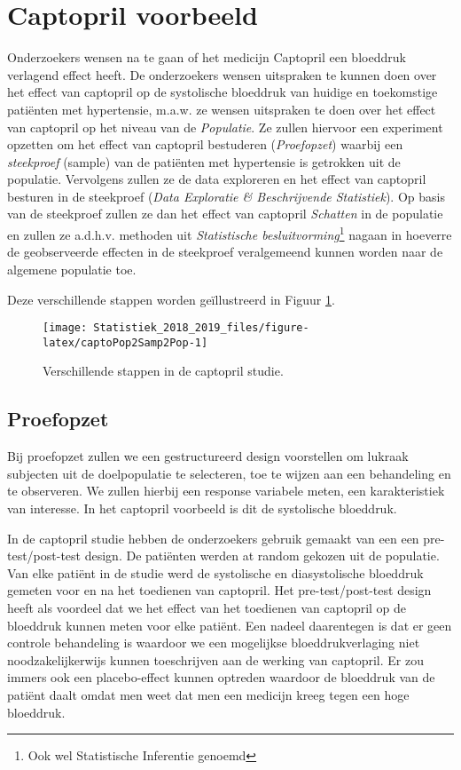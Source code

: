 \documentclass[12pt,dutch,coursenotes]{book}
\let\rmarkdownfootnote\footnote%
\def\footnote{\protect\rmarkdownfootnote}
\theoremstyle{definition}
\theoremstyle{definition}
\theoremstyle{definition}
\theoremstyle{remark}
\begin{document}
\section{Captopril voorbeeld}\label{captopril-voorbeeld}

Onderzoekers wensen na te gaan of het medicijn Captopril een bloeddruk
verlagend effect heeft. De onderzoekers wensen uitspraken te kunnen doen
over het effect van captopril op de systolische bloeddruk van huidige en
toekomstige patiënten met hypertensie, m.a.w. ze wensen uitspraken te
doen over het effect van captopril op het niveau van de
\emph{Populatie}. Ze zullen hiervoor een experiment opzetten om het
effect van captopril bestuderen (\emph{Proefopzet}) waarbij een
\emph{steekproef} (sample) van de patiënten met hypertensie is getrokken
uit de populatie. Vervolgens zullen ze de data exploreren en het effect
van captopril besturen in de steekproef (\emph{Data Exploratie \&
Beschrijvende Statistiek}). Op basis van de steekproef zullen ze dan het
effect van captopril \emph{Schatten} in de populatie en zullen ze
a.d.h.v. methoden uit \emph{Statistische besluitvorming}\footnote{Ook
  wel Statistische Inferentie genoemd} nagaan in hoeverre de
geobserveerde effecten in de steekproef veralgemeend kunnen worden naar
de algemene populatie toe.

Deze verschillende stappen worden geïllustreerd in Figuur
\ref{fig:captoPop2Samp2Pop}.

\begin{figure}

{\centering \texttt{[image: Statistiek\_2018\_2019\_files/figure-latex/captoPop2Samp2Pop-1]} 

}

\caption{Verschillende stappen in de captopril studie.}\label{fig:captoPop2Samp2Pop}
\end{figure}

\subsection{Proefopzet}\label{proefopzet}

Bij proefopzet zullen we een gestructureerd design voorstellen om
lukraak subjecten uit de doelpopulatie te selecteren, toe te wijzen aan
een behandeling en te observeren. We zullen hierbij een response
variabele meten, een karakteristiek van interesse. In het captopril
voorbeeld is dit de systolische bloeddruk.

In de captopril studie hebben de onderzoekers gebruik gemaakt van een
een pre-test/post-test design. De patiënten werden at random gekozen uit
de populatie. Van elke patiënt in de studie werd de systolische en
diasystolische bloeddruk gemeten voor en na het toedienen van captopril.
Het pre-test/post-test design heeft als voordeel dat we het effect van
het toedienen van captopril op de bloeddruk kunnen meten voor elke
patiënt. Een nadeel daarentegen is dat er geen controle behandeling is
waardoor we een mogelijkse bloeddrukverlaging niet noodzakelijkerwijs
kunnen toeschrijven aan de werking van captopril. Er zou immers ook een
placebo-effect kunnen optreden waardoor de bloeddruk van de patiënt
daalt omdat men weet dat men een medicijn kreeg tegen een hoge
bloeddruk.
\end{document}
